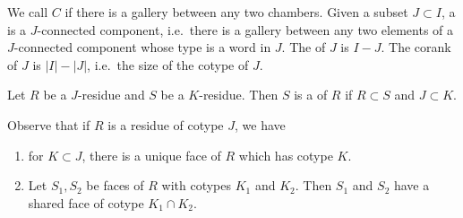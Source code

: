 \documentclass[11pt]{article}
\begin{document}
\begin{definition}
    We call $C$  if there is a gallery between any two chambers. Given a subset $J\subset I$, a  is a $J$-connected component, i.e.\ there is a gallery between any two elements of a $J$-connected component whose type is a word in $J$. The  of $J$ is $I-J$. The corank of $J$ is $|I|-|J|$, i.e.\ the size of the cotype of $J$. 
\end{definition}
\begin{definition}
    Let $R$ be a $J$-residue and $S$ be a $K$-residue. Then $S$ is a  of $R$ if $R\subset S$ and $J\subset K$. 
\end{definition}

Observe that if $R$ is a residue of cotype $J$, we have
\begin{enumerate}
    \item for $K\subset J$, there is a unique face of $R$ which has cotype $K$.
    \item Let $S_1,S_2$ be faces of $R$ with cotypes $K_1$ and $K_2$. Then $S_1$ and $S_2$ have a shared face of cotype $K_1\cap K_2$. 
\end{enumerate}






\end{document}
